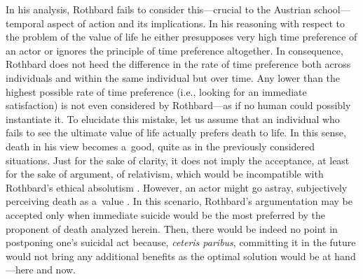 In his analysis, Rothbard fails to consider this---crucial to the Austrian school---temporal aspect of action and its implications. In his reasoning with respect to the problem of the value of life he either presupposes very high time preference of an actor or ignores the principle of time preference altogether. In consequence, Rothbard does not heed the difference in the rate of time preference both across individuals and within the same individual but over time. Any lower than the highest possible rate of time preference (i.e., looking for an immediate satisfaction) is not even considered by Rothbard---as if no human could possibly instantiate it. To elucidate this mistake, let us assume that an individual who fails to see the ultimate value of life actually prefers death to life. In this sense, death in his view becomes a~good, quite as in the previously considered situations. Just for the sake of clarity, it does not imply the acceptance, at least for the sake of argument, of relativism, which would be incompatible with Rothbard's ethical absolutism 
\parencite[see][]{}. %
 However, an actor might go astray, subjectively perceiving death as a~value 
\parencite[cf.][p.252]{}. %
 In this scenario, Rothbard's argumentation may be accepted only when immediate suicide would be the most preferred by the proponent of death analyzed herein. Then, there would be indeed no point in postponing one's suicidal act because, \textit{ceteris paribus}, committing it in the future would not bring any additional benefits as the optimal solution would be at hand---here and now.



